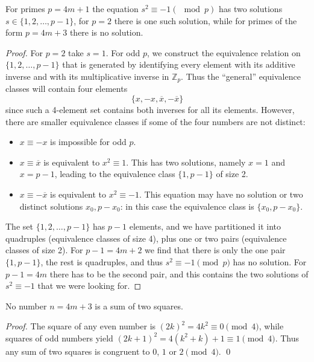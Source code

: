\begin{lemma}[Lemma 1]
  \label{ch04.lemma₁}
  \leanok
  For primes \(p = 4m + 1\) the equation \(s^2 \equiv -1 (\mod p)\) has two
  solutions \(s \in \{1, 2, \dots, p - 1\}\), for \(p = 2\) there is one such solution, while
  for primes of the form \(p = 4m + 3\) there is no solution.
\end{lemma}
\begin{proof}
   For $p = 2$ take $s = 1$.
   For odd $p$, we construct the equivalence relation on
   $\{1, 2, \dots, p - 1\}$ that is generated by identifying every
   element with its additive inverse and with its multiplicative inverse
   in $\mathbb{Z}_p$. Thus the ``general'' equivalence classes will contain four elements
  \[
  \{x, -x, \overline{x}, -\overline{x}\}
  \]
since such a 4-element set contains both inverses for all its elements. However,
there are smaller equivalence classes if some of the four numbers are not distinct:

\begin{itemize}
  \item $x \equiv -x$ is impossible for odd $p$.
  \item $x \equiv \overline{x}$ is equivalent to $x^2 \equiv 1$. This has two solutions,
    namely $x = 1$ and $x = p - 1$, leading to the equivalence class $\{1, p - 1\}$ of size 2.
  \item $x \equiv -\overline{x}$ is equivalent to $x^2 \equiv -1$. This equation may
    have no solution or two distinct solutions $x_0, p - x_0$: in this case the equivalence
    class is $\{x_0, p - x_0\}$.
\end{itemize}

The set $\{1, 2, \dots, p - 1\}$ has $p - 1$ elements, and we have partitioned it
into quadruples (equivalence classes of size 4), plus one or two pairs (equivalence
classes of size 2). For $p - 1 = 4m + 2$ we find that there is only the one pair $\{1, p - 1\}$,
the rest is quadruples, and thus $s^2 \equiv -1 \pmod{p}$ has no solution.
For $p - 1 = 4m$ there has to be the second pair,
and this contains the two solutions of $s^2 \equiv -1$ that we were looking for.
\end{proof}


\begin{lemma}[Lemma 2]
  \label{ch04.lemma2}
  \leanok
  No number \(n = 4m + 3\) is a sum of two squares.
\end{lemma}
\begin{proof}
  \leanok
  The square of any even number is $(2k)^2 = 4k^2 \equiv 0 \pmod{4}$,
  while squares of odd numbers yield $(2k + 1)^2 = 4(k^2 + k) + 1 \equiv 1 \pmod{4}$.
  Thus any sum of two squares is congruent to $0$, $1$ or $2 \pmod{4}$. \qed
\end{proof}

